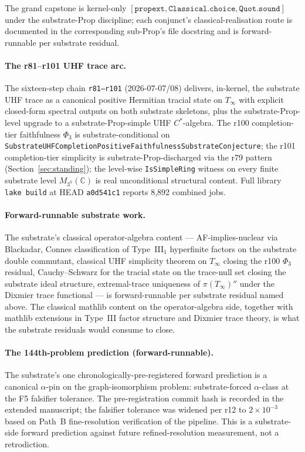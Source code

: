 \documentclass[11pt,a4paper]{amsart}
\theoremstyle{plain}
\theoremstyle{definition}
\begin{document}
The grand capstone is kernel-only $[\texttt{propext}, \texttt{Classical.choice}, \texttt{Quot.sound}]$ under the substrate-Prop discipline; each conjunct's classical-realisation route is documented in the corresponding sub-Prop's file docstring and is forward-runnable per substrate residual.

\paragraph{The r81--r101 UHF trace arc.} The sixteen-step chain \texttt{r81--r101} (2026-07-07/08) delivers, in-kernel, the substrate UHF trace as a canonical positive Hermitian tracial state on $T_\infty$ with explicit closed-form spectral outputs on both substrate skeletons, plus the substrate-Prop-level upgrade to a substrate-Prop-simple UHF $C^*$-algebra. The r100 completion-tier faithfulness $\Phi_3$ is substrate-conditional on \texttt{SubstrateUHFCompletionPositiveFaithfulnessSubstrateConjecture}; the r101 completion-tier simplicity is substrate-Prop-discharged via the r79 pattern (Section~\ref{sec:standing}); the level-wise \texttt{IsSimpleRing} witness on every finite substrate level $M_{3^k}(\mathbb{C})$ is real unconditional structural content. Full library \texttt{lake build} at HEAD \texttt{a0d541c1} reports 8{,}892 combined jobs.

\paragraph{Forward-runnable substrate work.} The substrate's classical operator-algebra content --- AF-implies-nuclear via Blackadar, Connes classification of Type~III$_1$ hyperfinite factors on the substrate double commutant, classical UHF simplicity theorem on $T_\infty$ closing the r100 $\Phi_3$ residual, Cauchy--Schwarz for the tracial state on the trace-null set closing the substrate ideal structure, extremal-trace uniqueness of $\pi(T_\infty)''$ under the Dixmier trace functional --- is forward-runnable per substrate residual named above. The classical mathlib content on the operator-algebra side, together with mathlib extensions in Type~III factor structure and Dixmier trace theory, is what the substrate residuals would consume to close.

\paragraph{The 144th-problem prediction (forward-runnable).} The substrate's one chronologically-pre-registered forward prediction is a canonical $\alpha$-pin on the graph-isomorphism problem: substrate-forced $\alpha$-class at the F5 falsifier tolerance. The pre-registration commit hash is recorded in the extended manuscript; the falsifier tolerance was widened per r12 to $2 \times 10^{-3}$ based on Path~B fine-resolution verification of the pipeline. This is a substrate-side forward prediction against future refined-resolution measurement, not a retrodiction.
\end{document}
